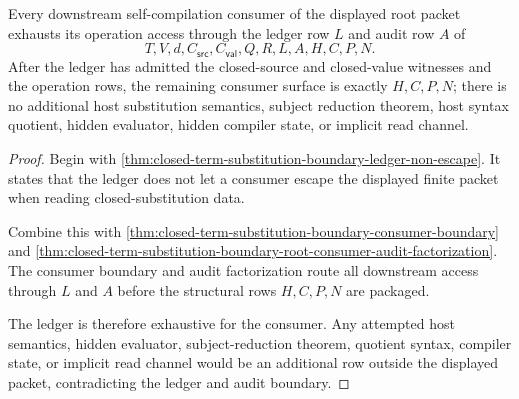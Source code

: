 \begin{theorem}
\label{thm:closed-term-substitution-boundary-consumer-ledger-exhaustion}
Every downstream self-compilation consumer of the displayed root packet exhausts its operation access through the ledger row $L$ and audit row $A$ of
$$
T,V,d,C_{\mathsf{src}},C_{\mathsf{val}},Q,R,L,A,H,C,P,N.
$$
After the ledger has admitted the closed-source and closed-value witnesses and the operation rows, the remaining consumer surface is exactly $H,C,P,N$; there is no additional host substitution semantics, subject reduction theorem, host syntax quotient, hidden evaluator, hidden compiler state, or implicit read channel.
\end{theorem}
\begin{proof}
Begin with \autoref{thm:closed-term-substitution-boundary-ledger-non-escape}. It states that the ledger does not let a consumer escape the displayed finite packet when reading closed-substitution data.

Combine this with \autoref{thm:closed-term-substitution-boundary-consumer-boundary} and \autoref{thm:closed-term-substitution-boundary-root-consumer-audit-factorization}. The consumer boundary and audit factorization route all downstream access through $L$ and $A$ before the structural rows $H,C,P,N$ are packaged.

The ledger is therefore exhaustive for the consumer. Any attempted host semantics, hidden evaluator, subject-reduction theorem, quotient syntax, compiler state, or implicit read channel would be an additional row outside the displayed packet, contradicting the ledger and audit boundary.
\end{proof}

